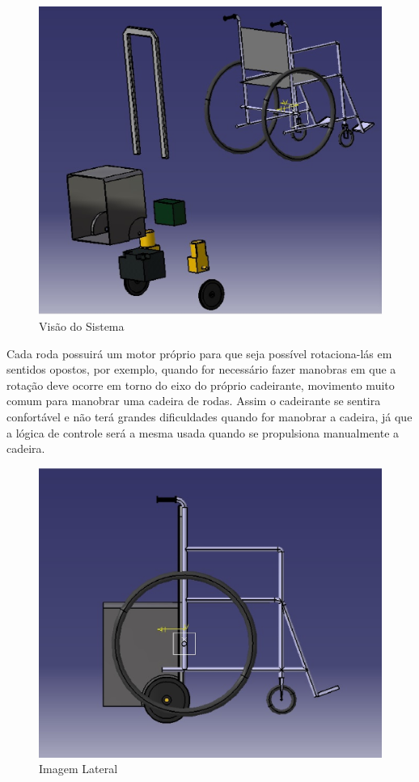 \begin{figure}[!htb]
\centering
\includegraphics[keepaspectratio=true,scale=0.4]{figuras/estrutura/explode}
\caption{Visão do Sistema}
\label{fig:sistema}
\end{figure}

Cada roda possuirá um motor próprio para que seja possível rotaciona-lás em sentidos opostos, por exemplo, quando for necessário fazer manobras em que a rotação deve ocorre em torno do eixo do próprio cadeirante, movimento muito comum para manobrar uma cadeira de rodas. Assim o cadeirante se sentira confortável e não terá grandes dificuldades quando for manobrar a cadeira, já que a lógica de controle será a mesma usada quando se propulsiona manualmente a cadeira.

\begin{figure}[!htb]
\centering
\includegraphics[keepaspectratio=true,scale=0.4]{figuras/estrutura/vista_lateral_cadeira}
\caption{Imagem Lateral}
\label{fig:lateral}
\end{figure}

